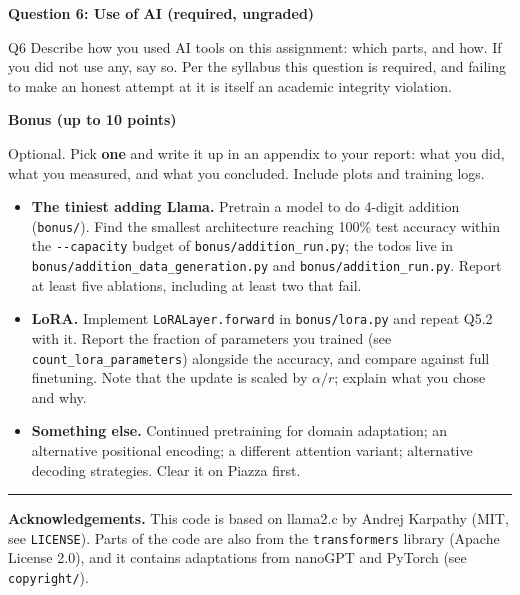\documentclass[11pt]{article}
\newcommand{\problem}[1]{%
  \vspace{1em}
  \noindent\colorbox{headerblue}{\parbox{\dimexpr\textwidth-2\fboxsep}{%
    \vspace{2pt}\textbf{\large #1}\vspace{2pt}}}
  \vspace{0.6em}
}
\begin{document}
\problem{Question 6: Use of AI (required, ungraded)}

\begin{deliverables}{Q6}
Describe how you used AI tools on this assignment: which parts, and how. If you did not use any,
say so. Per the syllabus this question is required, and failing to make an honest attempt at it is
itself an academic integrity violation.
\end{deliverables}

\problem{Bonus (up to 10 points)}

\noindent Optional. Pick \textbf{one} and write it up in an appendix to your report: what you did, what you
measured, and what you concluded. Include plots and training logs.

\begin{itemize}[leftmargin=2em]
  \item \textbf{The tiniest adding Llama.} Pretrain a model to do 4-digit addition
    (\texttt{bonus/}). Find the smallest architecture reaching 100\% test accuracy within the
    \texttt{-\/-capacity} budget of \texttt{bonus/addition\_run.py}; the todos live in
    \texttt{bonus/addition\_data\_generation.py} and \texttt{bonus/addition\_run.py}. Report at least five ablations, including at least two that fail.
  \item \textbf{LoRA.} Implement \texttt{LoRALayer.forward} in \texttt{bonus/lora.py} and repeat
    Q5.2 with it. Report the fraction of parameters you trained (see
    \texttt{count\_lora\_parameters}) alongside the accuracy, and compare against full finetuning.
    Note that the update is scaled by $\alpha/r$; explain what you chose and why.
  \item \textbf{Something else.} Continued pretraining for domain adaptation; an alternative
    positional encoding; a different attention variant; alternative decoding strategies. Clear it
    on Piazza first.
\end{itemize}

\vspace{1.2em}
\hrule
\vspace{0.8em}

\noindent\textbf{Acknowledgements.} This code is based on llama2.c by Andrej Karpathy (MIT, see
\texttt{LICENSE}). Parts of the code are also from the \texttt{transformers} library (Apache
License 2.0), and it contains adaptations from nanoGPT and PyTorch (see \texttt{copyright/}).
\end{document}
